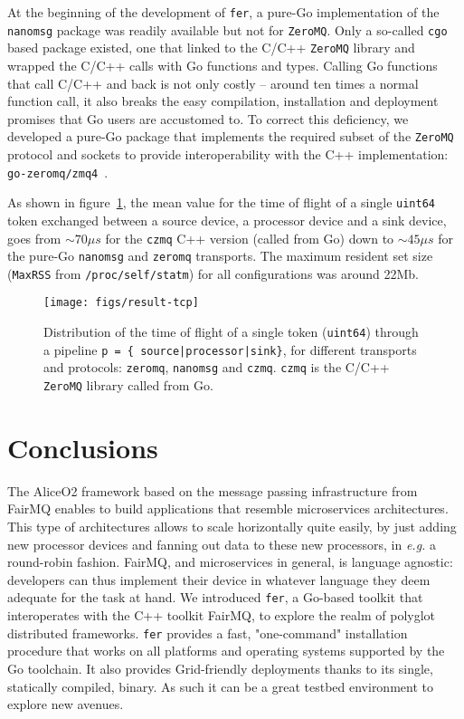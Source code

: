 \documentclass{webofc}
\begin{document}
At the beginning of the development of \texttt{fer}, a pure-Go implementation of the \texttt{nanomsg} package was readily available but not for \texttt{ZeroMQ}.
Only a so-called \texttt{cgo} based package existed, one that linked to the C/C++ \texttt{ZeroMQ} library and wrapped the C/C++ calls with Go functions and types.
Calling Go functions that call C/C++ and back is not only costly -- around ten times a normal function call, it also breaks the easy compilation, installation and deployment promises that Go users are accustomed to.
To correct this deficiency, we developed a pure-Go package that implements the required subset of the \texttt{ZeroMQ} protocol and sockets to provide interoperability with the C++ implementation: \texttt{go-zeromq/zmq4}~\cite{ref-go-zmq}.

As shown in figure~\ref{fig-tof-tcp}, the mean value for the time of flight of a single \texttt{uint64} token exchanged between a source device, a processor device and a sink device, goes from $\sim 70\mu s$ for the \texttt{czmq} C++ version (called from Go) down to $\sim 45\mu s$ for the pure-Go \texttt{nanomsg} and \texttt{zeromq} transports.
The maximum resident set size (\texttt{MaxRSS} from \texttt{/proc/self/statm}) for all configurations was around 22Mb.

\begin{figure}[h]
\centering
\texttt{[image: figs/result-tcp]}
	\caption{Distribution of the time of flight of a single token (\texttt{uint64}) through a pipeline \texttt{p = \{ source|processor|sink\}}, for different transports and protocols: \texttt{zeromq}, \texttt{nanomsg} and \texttt{czmq}.
	\texttt{czmq} is the C/C++ \texttt{ZeroMQ} library called from Go.}
\label{fig-tof-tcp}
\end{figure}

\section{Conclusions}

The AliceO2 framework based on the message passing infrastructure from FairMQ enables to build applications that resemble microservices architectures.
This type of architectures allows to scale horizontally quite easily, by just adding new processor devices and fanning out data to these new processors, in \emph{e.g.} a round-robin fashion.
FairMQ, and microservices in general, is language agnostic: developers can thus implement their device in whatever language they deem adequate for the task at hand.
We introduced \texttt{fer}, a Go-based toolkit that interoperates with the C++ toolkit FairMQ, to explore the realm of polyglot distributed frameworks.
\texttt{fer} provides a fast, "one-command" installation procedure that works on all platforms and operating systems supported by the Go toolchain.
It also provides Grid-friendly deployments thanks to its single, statically compiled, binary.
As such it can be a great testbed environment to explore new avenues.
\end{document}
